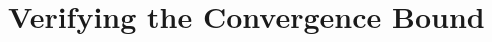 \documentclass[VANCOUVER,STIX1COL]{WileyNJD-v2}
\begin{document}




\section{Verifying the Convergence Bound}
\label{sec:verify}
\end{document}
